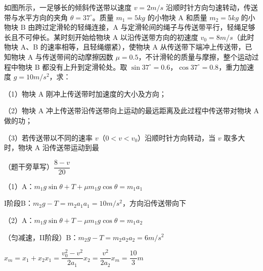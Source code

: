 \begin{problem}[\unclear{17}.（13分）]
如图所示，一足够长的倾斜传送带以速度 $v=2\unit{m/s}$ 沿顺时针方向匀速转动，传送带与水平方向的夹角 $\theta=37^\circ$。质量 $m_1=5\unit{kg}$ 的小物块 A 和质量 $m_2=5\unit{kg}$ 的小物块 B 由跨过定滑轮的轻绳连接，A 与定滑轮间的绳子与传送带平行，轻绳足够长且不可伸长。某时刻开始给物块 A 以沿传送带方向的初速度 $v_0=8\unit{m/s}$（此时物块 A、B 的速率相等，且轻绳绷紧），使物块 A 从传送带下端冲上传送带，已知物块 A 与传送带间的动摩擦因数 $\mu=0.5$，不计滑轮的质量与摩擦，整个运动过程中物块 B 都没有上升到定滑轮处。取 $\sin37^\circ=0.6$，$\cos37^\circ=0.8$，重力加速度 $g=10\unit{m/s^2}$，求：

（1）物块 A 刚冲上传送带时加速度的大小及方向；

（2）物块 A 冲上传送带沿传送带向上运动的最远距离及此过程中传送带对物块 A 做的功；

（3）若传送带以不同的速率 $v$（$0<v<v_0$）沿顺时针方向转动，当 $v$ 取多大时，物块 A 沿传送带运动到最%

（题干旁草写）\quad $\dfrac{8-v}{20}$\quad {}\quad {}


\begin{solution}
（1）A：$m_1g\sin\theta+T+\mu m_1g\cos\theta=m_1a_1$

I阶段\quad B：$m_2g-T=m_2a_1$\qquad $a_1=10\unit{m/s^2}$，方向沿传送带向下

（2）A：$m_1g\sin\theta+T-\mu m_1g\cos\theta=m_1a_2$

（匀减速，II阶段）\quad B：$m_2g-T=m_2a_2$\qquad $a_2=6\unit{m/s^2}$

$x_m=x_1+x_2$\qquad $x_1=\dfrac{v_0^2-v^2}{2a_1}$\qquad $x_2=\dfrac{v^2}{2a_2}$\qquad $x_m=\dfrac{10}{3}\unit{m}$


\end{solution}
\end{problem}

